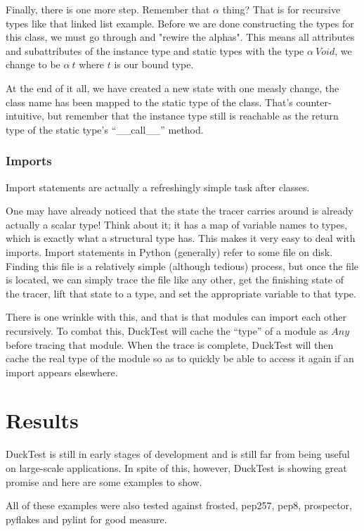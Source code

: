 \documentclass{scrartcl}
\begin{document}
\begin{multicols}{2}
Finally, there is one more step. Remember that $\alpha$ thing? That is for
recursive types like that linked list example. Before we are done constructing
the types for this class, we must go through and "rewire the alphas". This
means all attributes and subattributes of the instance type and static types
with the type $\alpha\ Void$, we change to be $\alpha\ t$ where $t$ is our bound
type.

At the end of it all, we have created a new state with one measly change,
the class name has been mapped to the static type of the class. That's counter-intuitive,
but remember that the instance type still is reachable as the return type
of the static type's ``\_\_call\_\_'' method.

\subsubsection*{Imports}

Import statements are actually a refreshingly simple task after classes.

One may have already noticed that the state the tracer carries around is
already actually a scalar type! Think about it; it has a map of variable names
to types, which is exactly what a structural type has. This makes it very easy
to deal with imports. Import statements in Python (generally) refer to some file
on disk. Finding this file is a relatively simple (although tedious) process, but
once the file is located, we can simply trace the file like any other, get the
finishing state of the tracer, lift that state to a type, and set the appropriate
variable to that type.

There is one wrinkle with this, and that is that modules can import each other
recursively. To combat this, DuckTest will cache the ``type'' of a module as
$Any$ before tracing that module. When the trace is complete, DuckTest will
then cache the real type of the module so as to quickly be able to access
it again if an import appears elsewhere.

\section*{Results}

DuckTest is still in early stages of development and is still far from being
useful on large-scale applications. In spite of this, however, DuckTest
is showing great promise and here are some examples to show.

All of these examples were also tested against frosted, pep257, pep8,
prospector, pyflakes and pylint for good measure.


\end{multicols}
\end{document}
